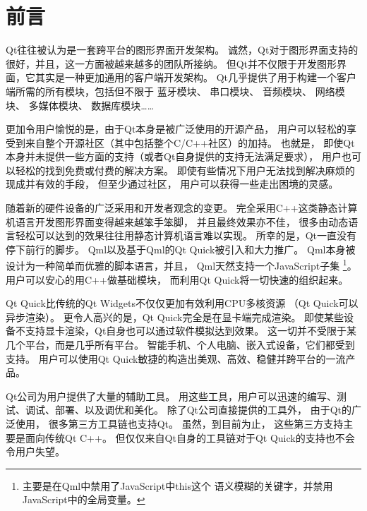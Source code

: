 ﻿






\cleardoublepage                              %
\setcounter{secnumdepth}{-2}                  %
\chapter{
前言
}\label{c000020}
\setcounter{secnumdepth}{4}                   %


Qt往往被认为是一套跨平台的图形界面开发架构。
诚然，Qt对于图形界面支持的很好，并且，这一方面被越来越多的团队所接纳。
但Qt并不仅限于开发图形界面，它其实是一种更加通用的客户端开发架构。
Qt几乎提供了用于构建一个客户端所需的所有模块，包括但不限于
蓝牙模块、
串口模块、
音频模块、
网络模块、
多媒体模块、
数据库模块……

更加令用户愉悦的是，由于Qt本身是被广泛使用的开源产品，
用户可以轻松的享受到来自整个开源社区（其中包括整个C/C{\sourcefonttwo{}+}{\sourcefonttwo{}+}社区）的加持。
也就是，
即使Qt本身并未提供一些方面的支持（或者Qt自身提供的支持无法满足要求），
用户也可以轻松的找到免费或付费的解决方案。
即使有些情况下用户无法找到解决麻烦的现成并有效的手段，
但至少通过社区，
用户可以获得一些走出困境的灵感。

随着新的硬件设备的广泛采用和开发者观念的变更。
完全采用C{\sourcefonttwo{}+}{\sourcefonttwo{}+}这类静态计算机语言开发图形界面变得越来越笨手笨脚，
并且最终效果亦不佳，
很多由动态语言轻松可以达到的效果往往用静态计算机语言难以实现。
所幸的是，Qt一直没有停下前行的脚步。
Qml以及基于Qml的Qt Quick被引入和大力推广。
Qml本身被设计为一种简单而优雅的脚本语言，并且，
Qml天然支持一个JavaScript子集
\footnote{
主要是在Qml中禁用了JavaScript中this这个
语义模糊的关键字，并禁用JavaScript中的全局变量。
}。
用户可以安心的用C{\sourcefonttwo{}+}{\sourcefonttwo{}+}做基础模块，
而利用Qt Quick将一切快速的组织起来。


Qt Quick比传统的Qt Widgets不仅仅更加有效利用CPU多核资源
（Qt Quick可以异步渲染）。
更令人高兴的是，Qt Quick完全是在显卡端完成渲染。
即使某些设备不支持显卡渲染，Qt自身也可以通过软件模拟达到效果。
这一切并不受限于某几个平台，而是几乎所有平台。
智能手机、个人电脑、嵌入式设备，它们都受到支持。
用户可以使用Qt Quick敏捷的构造出美观、高效、稳健并跨平台的一流产品。

Qt公司为用户提供了大量的辅助工具。
用这些工具，用户可以迅速的编写、测试、调试、部署、以及调优和美化。
除了Qt公司直接提供的工具外，
由于Qt的广泛使用，
很多第三方工具链也支持Qt。
虽然，到目前为止，
这些第三方支持主要是面向传统Qt C{\sourcefonttwo{}+}{\sourcefonttwo{}+}。
但仅仅来自Qt自身的工具链对于Qt Quick的支持也不会令用户失望。


